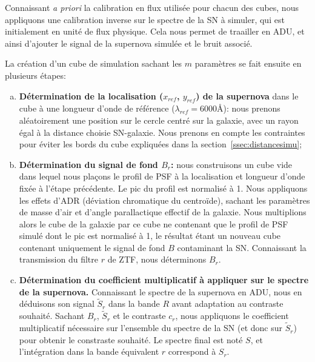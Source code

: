 \documentclass[../main/main.tex]{subfiles}
\begin{document}
Connaissant \textit{a priori} la calibration en flux utilisée pour chacun des
cubes, nous appliquons une calibration inverse sur le spectre de la SN à simuler,
qui est initialement en unité de flux physique.
Cela nous permet de traailler en ADU, et ainsi d'ajouter le signal de la supernova simulée et le
bruit associé.

La création d'un cube de simulation sachant les $m$ paramètres se fait ensuite en plusieurs étapes:

  \begin{enumerate}[(a)]
    \itemsep=0em
    \item \textbf{Détermination de la localisation ($x_{ref}$, $y_{ref}$) de la supernova} dans le cube
      à une longueur d'onde de référence ($\lambda_{ref}=6000$\AA):
      nous prenons aléatoirement une position sur le cercle centré sur
      la galaxie, avec un rayon égal à la distance choisie
      SN-galaxie. Nous prenons en compte les contraintes pour éviter les
      bords du cube expliquées dans la section~\ref{ssec:distancesimu};
      
  \item \textbf{Détermination du signal de fond $B_{r}$:} nous construisons un cube vide dans
    lequel nous plaçons le profil de PSF à la localisation et longueur
    d'onde fixée à l'étape
    précédente. Le pic du profil est normalisé à 1. Nous appliquons les
    effets d'ADR (déviation chromatique du centroïde), sachant les paramètres de masse d'air et
    d'angle parallactique effectif de la galaxie. Nous multiplions alors
    le cube de la galaxie par
    ce cube ne contenant que le profil de PSF simulé dont le pic est
    normalisé à 1, le résultat étant un nouveau cube contenant uniquement le signal de fond $B$
    contaminant la SN. Connaissant la transmission du filtre $r$ de ZTF,
    nous déterminons $B_{r}$.

  \item \textbf{Détermination du coefficient multiplicatif à appliquer sur le
    spectre de la supernova.} Connaissant le spectre de la
    supernova en ADU, nous en déduisons son signal $\tilde{S}_{r}$ dans
    la bande $R$ avant adaptation au
    contraste souhaité. Sachant $B_{r}$, $\tilde{S}_{r}$ et le contraste
    $c_{r}$, nous
    appliquons le
    coefficient multiplicatif nécessaire sur l'ensemble du spectre de la
    SN (et donc sur $\tilde{S}_{r}$) pour obtenir le constraste
    souhaité. Le spectre final est noté $S$, et l'intégration dans la
    bande équivalent $r$ correspond à $S_{r}$.


\end{enumerate}
\end{document}
